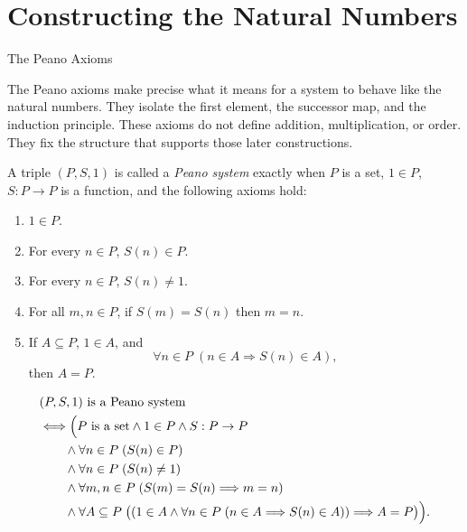 \section{Constructing the Natural Numbers}

\begin{topicbox}{The Peano Axioms}
\begin{exposition}
The Peano axioms make precise what it means for a system to behave like
the natural numbers. They isolate the first element, the successor map,
and the induction principle. These axioms do not define addition,
multiplication, or order. They fix the structure that supports those
later constructions.
\end{exposition}

\begin{tcolorbox}[colback=defbox, colframe=defborder, arc=2pt,
  left=6pt, right=6pt, top=4pt, bottom=4pt,
  title={\small\textbf{Definition (Peano System)}},
  fonttitle=\small\bfseries]
\begin{definition}
\label{def:peano-system}
A triple $(P,S,1)$ is called a \emph{Peano system} exactly when $P$ is a set,
$1 \in P$, $S : P \to P$ is a function, and the following axioms hold:
\begin{enumerate}
  \item[\textbf{P1.}] $1 \in P$.
  \item[\textbf{P2.}] For every $n \in P$, $S(n) \in P$.
  \item[\textbf{P3.}] For every $n \in P$, $S(n) \neq 1$.
  \item[\textbf{P4.}] For all $m,n \in P$, if $S(m)=S(n)$ then $m=n$.
  \item[\textbf{P5.}] If $A \subseteq P$, $1 \in A$, and
  \[
    \forall n \in P\;(n \in A \Longrightarrow S(n) \in A),
  \]
  then $A=P$.
\end{enumerate}
\end{definition}
\end{tcolorbox}

\begin{remark*}
\[
\begin{aligned}
&(P,S,1) \text{ is a Peano system}\\
&\Longleftrightarrow
\Bigl(P \text{ is a set} \land 1 \in P \land S : P \to P \\
&\qquad \land \forall n \in P\;(S(n) \in P) \\
&\qquad \land \forall n \in P\;(S(n) \neq 1) \\
&\qquad \land \forall m,n \in P\;(S(m)=S(n) \Longrightarrow m=n) \\
&\qquad \land \forall A \subseteq P\;
\bigl((1 \in A \land
\forall n \in P\;(n \in A \Longrightarrow S(n) \in A))
\Longrightarrow A=P\bigr)\Bigr).
\end{aligned}
\]
\end{remark*}


\end{topicbox}
